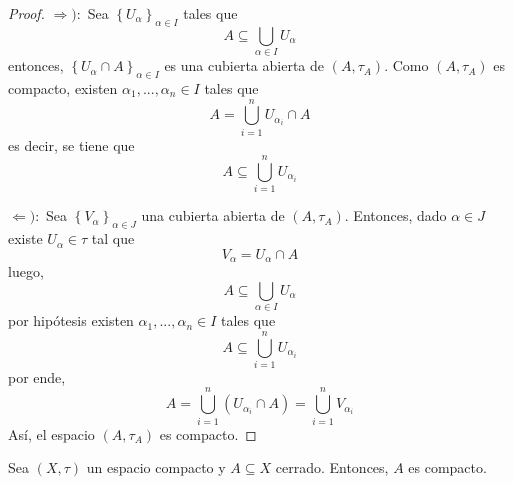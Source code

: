 \documentclass[12pt]{report}
\theoremstyle{largebreak}
\begin{document}
    \begin{proof}
        $\Rightarrow):$ Sea $\left\{U_\alpha \right\}_{\alpha\in I}$ tales que
        \begin{equation*}
            A\subseteq\bigcup_{\alpha\in I}U_\alpha
        \end{equation*}
        entonces, $\left\{U_\alpha\cap A \right\}_{\alpha\in I}$ es una cubierta abierta de $(A,\tau_A)$. Como $(A,\tau_A)$ es compacto, existen $\alpha_1,...,\alpha_n\in I$ tales que
        \begin{equation*}
            A=\bigcup_{ i = 1}^n U_{\alpha_i}\cap A
        \end{equation*}
        es decir, se tiene que
        \begin{equation*}
            A\subseteq\bigcup_{ i =1}^n U_{\alpha_i}
        \end{equation*}

        $\Leftarrow):$ Sea $\left\{V_\alpha \right\}_{\alpha\in J}$ una cubierta abierta de $(A,\tau_A)$. Entonces, dado $\alpha\in J$ existe $U_\alpha\in \tau$ tal que
        \begin{equation*}
            V_\alpha=U_\alpha\cap A
        \end{equation*}
        luego,
        \begin{equation*}
            A\subseteq \bigcup_{\alpha\in I}U_\alpha
        \end{equation*}
        por hipótesis existen $\alpha_1,...,\alpha_n\in I$ tales que
        \begin{equation*}
            A\subseteq \bigcup_{ i=1}^n U_{\alpha_i}
        \end{equation*}
        por ende,
        \begin{equation*}
            A=\bigcup_{ i=1}^n \left(U_{\alpha_i}\cap A\right)=\bigcup_{ i=1}^n V_{\alpha_i}
        \end{equation*}
        Así, el espacio $(A,\tau_A)$ es compacto.
    \end{proof}

    \begin{propo}
        Sea $(X,\tau)$ un espacio compacto y $A\subseteq X$ cerrado. Entonces, $A$ es compacto.
    \end{propo}
\end{document}
